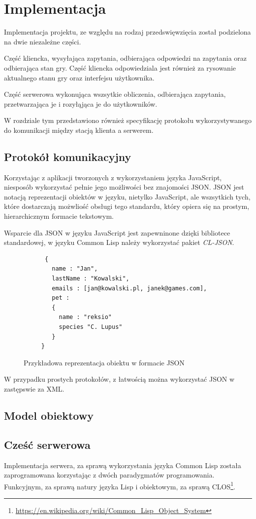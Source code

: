 \section{Implementacja}
Implementacja projektu, ze względu na rodzaj przedswięwzięcia został podzielona na dwie niezależne części.

Część kliencka, wysyłająca zapytania, odbierająca odpowiedzi na zapytania oraz odbierająca stan gry. Część kliencka odpowiedziala jest również za rysowanie aktualnego stanu gry oraz interfejsu użytkownika.

Część serwerowa wykonująca wszsytkie obliczenia, odbierająca zapytania, przetwarzająca je i rozyłąjąca je do użytkowników.

W rozdziale tym przedstawiono również specyfikację protokołu wykorzystywanego do komunikacji między stacją klienta a serwerem.
\subsection{Protokół komunikacyjny}

Korzystając z aplikacji tworzonych z wykorzystaniem języka JavaScript, niesposób wykorzystać pełnie jego możliwości bez znajomości JSON. JSON jest notacją reprezentacji obiektów w języku, nietylko JavaScript, ale wszsytkich tych, które dostarczają możwliość obsługi tego standardu, który opiera się na prostym, hierarchicznym formacie tekstowym.

Wsparcie dla JSON w języku JavaScript jest zapewninone dzięki bibliotece standardowej, w języku Common Lisp należy wykorzystać pakiet \emph{CL-JSON}.
\begin{figure}[ht]
    \centering
    \begin{verbatim}
      {
        name : "Jan",
        lastName : "Kowalski",
        emails : [jan@kowalski.pl, janek@games.com],
        pet :
        {
          name : "reksio"
          species "C. Lupus"
        }
     }
      \end{verbatim}
    \caption{Przykładowa reprezentacja obiektu w formacie JSON}
    \label{fig:jsonexample}
\end{figure}
W przypadku prostych protokołów, z łatwością można wykorzystać JSON w zastępswie za XML.


\subsection{Model obiektowy}

\subsection{Cześć serwerowa}
Implementacja serwera, za sprawą wykorzystania języka Common Lisp została zaprogramowana korzystając z dwóch paradygmatów programowania. Funkcyjnym, za sprawą natury języka Lisp i obiektowym, za sprawą CLOS\footnote{\url{https://en.wikipedia.org/wiki/Common_Lisp_Object_System}}.

